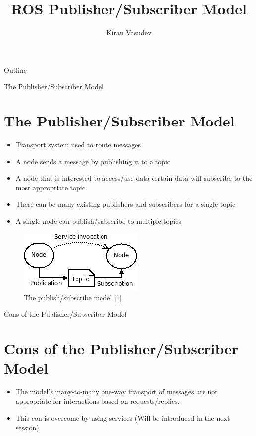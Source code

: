 \documentclass{beamer}
\title{ROS Publisher/Subscriber Model}
\author{Kiran Vasudev\inst{1}}
\institute[] 
{
  \inst{1}
  Hochschule Bonn-Rhein-Sieg

}
\begin{document}
\begin{frame}
  \titlepage
\end{frame}

\begin{frame}{Outline}
  \tableofcontents
\end{frame}

\begin{frame}{The Publisher/Subscriber Model}
\section{The Publisher/Subscriber Model}
  \begin{itemize}
  \item {
	Transport system used to route messages
  }
  \item {
	A node sends a message by publishing it to a topic
  }
  \item {A node that is interested to access/use data certain data will subscribe to the most appropriate topic}
  \item{There can be many existing publishers and subscribers for a single topic}
  \item{A single node can publish/subscribe to multiple topics}
  \end{itemize}
\end{frame}

\begin{frame}
	\begin{figure}
		\begin{center}
			\includegraphics[scale=0.8]{images/basic_ros}
			\caption{The publish/subscribe model [1]}	
		\end{center}
	\end{figure}
\end{frame}


\begin{frame}{Cons of the Publisher/Subscriber Model}
\section{Cons of the Publisher/Subscriber Model}
  \begin{itemize}
  \item {
    The model's many-to-many one-way transport of messages are not appropriate for interactions based on requests/replies.
  }
  \item {   
    This con is overcome by using services (Will be introduced in the next session)
  }	
  \end{itemize}

\end{frame}
\end{document}
